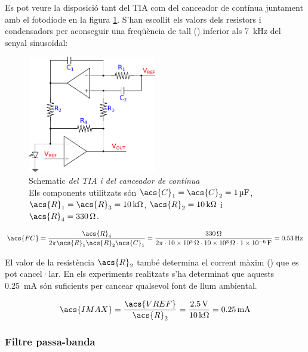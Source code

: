 Es pot veure la disposició tant del \ac{TIA} com del cance\lgem ador de contínua juntament amb el fotodíode en la figura \ref{fig:schematic_tia}. S'han escollit els valors dels resistors i condensadors per aconseguir una freqüència de tall ()  inferior als \SI{7}{\kilo\hertz} del senyal sinusoïdal:

\begin{figure}[htp]
	\centering
	\includegraphics[width=0.5\textwidth]{Figures/schematic_tia.pdf}
	\caption[\acs{TIA} i cance\lgem ador de contínua]{Schematic\textit{ del \ac{TIA} i del cance\lgem ador de contínua}\\{\footnotesize Els components utilitzats són $ \acs{C}_1 = \acs{C}_2=\SI{1}{\micro\farad} $, $ \acs{R}_1 = \acs{R}_3 =\SI{10}{\kilo\ohm} $, $ \acs{R}_2=\SI{10}{\kilo\ohm} $ i $ \acs{R}_4=\SI{330}{\ohm} $.}}
	\label{fig:schematic_tia}
\end{figure}

\begin{equation}
\acs{FC} = \frac{\acs{R}_4}{2\pi \acs{R}_1 \acs{R}_2 \acs{C}_1} = \frac{\SI{330}{\ohm}}{2\pi \cdot \SI{10e3}{\ohm} \cdot \SI{10e3}{\ohm} \cdot \SI{1e-6}{\farad}} = \SI{0.53}{\hertz}
\end{equation}

El valor de la resistència $ \acs{R}_2 $ també determina el corrent màxim () que es pot cancel·lar. En els experiments realitzats s'ha determinat que aquests \SI{0.25}{\milli\ampere} són suficients per cance\lgem ar qualsevol font de llum ambiental.

\begin{equation}
\acs{IMAX} = \frac{\acs{VREF}}{\acs{R}_2} = \frac{\SI{2.5}{\volt}}{\SI{10}{\kilo\ohm}} = \SI{0.25}{\milli\ampere}
\end{equation}

\subsubsection{Filtre passa-banda}

